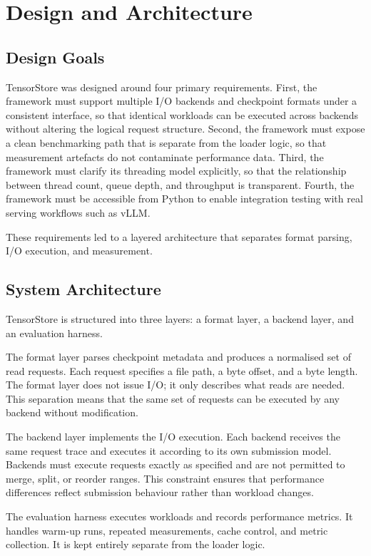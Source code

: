 \chapter{Design and Architecture}
\label{chap:design}

\section{Design Goals}

TensorStore was designed around four primary requirements. First, the framework must support multiple I/O backends and checkpoint formats under a consistent interface, so that identical workloads can be executed across backends without altering the logical request structure. Second, the framework must expose a clean benchmarking path that is separate from the loader logic, so that measurement artefacts do not contaminate performance data. Third, the framework must clarify its threading model explicitly, so that the relationship between thread count, queue depth, and throughput is transparent. Fourth, the framework must be accessible from Python to enable integration testing with real serving workflows such as vLLM.

These requirements led to a layered architecture that separates format parsing, I/O execution, and measurement.

\section{System Architecture}

TensorStore is structured into three layers: a format layer, a backend layer, and an evaluation harness.

The format layer parses checkpoint metadata and produces a normalised set of read requests. Each request specifies a file path, a byte offset, and a byte length. The format layer does not issue I/O; it only describes what reads are needed. This separation means that the same set of requests can be executed by any backend without modification.

The backend layer implements the I/O execution. Each backend receives the same request trace and executes it according to its own submission model. Backends must execute requests exactly as specified and are not permitted to merge, split, or reorder ranges. This constraint ensures that performance differences reflect submission behaviour rather than workload changes.

The evaluation harness executes workloads and records performance metrics. It handles warm-up runs, repeated measurements, cache control, and metric collection. It is kept entirely separate from the loader logic.

